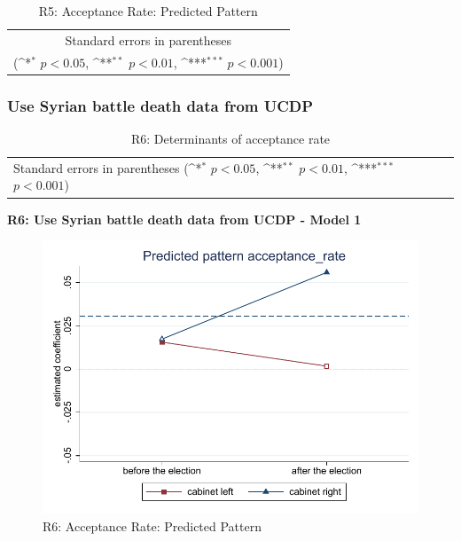\documentclass[10pt,a4paper]{scrartcl}
\begin{document}
\begin{table}[!ht]\centering
	\footnotesize
	\renewcommand{\arraystretch}{1.2}
	\def\sym#1{\ifmmode^{#1}\else\(^{#1}\)\fi}
	\caption{R5: Acceptance Rate: Predicted Pattern}
	\begin{tabular}{l*{2}{c}}
		\hline\hline
		
		\hline\hline
		\multicolumn{3}{c}{\footnotesize Standard errors in parentheses} \\
		\multicolumn{3}{c}{\footnotesize (\sym{*} \(p<0.05\), \sym{**} \(p<0.01\), \sym{***} \(p<0.001\))} \\
	\end{tabular}
\end{table}




\clearpage
\FloatBarrier
\subsubsection{Use Syrian battle death data from UCDP}
\begin{table}[!ht]\centering
	\renewcommand{\arraystretch}{1.25}
	\small
	\def\sym#1{\ifmmode^{#1}\else\(^{#1}\)\fi}
	\caption{R6: Determinants of acceptance rate}
	\begin{tabular}{l*{3}{c}}
		\hline\hline
		
		\hline\hline
		\multicolumn{4}{l}{\footnotesize Standard errors in parentheses (\sym{*} \(p<0.05\), \sym{**} \(p<0.01\), \sym{***} \(p<0.001\))}\\
	\end{tabular}
\end{table}

\clearpage
\textbf{R6: Use Syrian battle death data from UCDP - Model 1}
\begin{figure}[!ht]
	\centering
	\includegraphics[width=1\textwidth]{figures_edited/acceptance_rate_graph1_R6.pdf}
	\caption{R6: Acceptance Rate: Predicted Pattern}
\end{figure}
\end{document}
